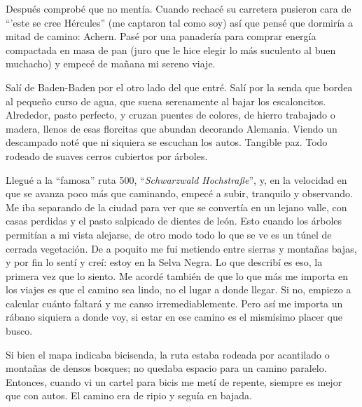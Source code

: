 Despu\'es comprob\'e que no ment\'ia. Cuando rechac\'e su carretera pusieron
cara de ``'este se cree H\'ercules'' (me captaron tal como
soy) as\'i que pens\'e que dormir\'ia a mitad de camino: Achern. Pas\'e por
una panader\'ia para comprar energ\'ia compactada en masa de pan (juro que le
hice elegir lo m\'as suculento al buen muchacho) y empec\'e de ma\~nana mi
sereno viaje.

Sal\'i de Baden-Baden por el otro lado del que entr\'e. Sal\'i por la senda que
bordea al peque\~no curso de agua, que suena serenamente al bajar los
escaloncitos. Alrededor, pasto perfecto, y cruzan puentes de colores, de hierro
trabajado o madera, llenos de esas florcitas que abundan decorando Alemania.
Viendo un descampado not\'e que ni siquiera se escuchan los autos. Tangible paz.
Todo rodeado de suaves cerros cubiertos por \'arboles.

Llegu\'e a la ``famosa'' ruta 500, ``\emph{Schwarzwald Hochstra\ss e}'', y, en
la velocidad en que se avanza poco m\'as que caminando, empec\'e a subir,
tranquilo y observando. Me iba separando de la ciudad para ver que se
convert\'ia en un lejano valle, con casas perdidas y el pasto salpicado de
dientes de le\'on. Esto cuando los \'arboles permit\'ian a mi vista alejarse,
de otro modo todo lo que se ve es un t\'unel de cerrada vegetaci\'on. De a
poquito me fui metiendo entre sierras y monta\~nas bajas, y por fin lo sent\'i
y cre\'i: estoy en la Selva Negra. Lo que describ\'i es eso, la primera vez
que lo siento. Me acord\'e tambi\'en de que lo que m\'as me importa en los
viajes es que el camino sea lindo, no el lugar a donde llegar. Si no, empiezo
a calcular cu\'anto faltar\'a y me canso irremediablemente. Pero as\'i me
importa un r\'abano siquiera a donde voy, si estar en ese camino es el
mism\'isimo placer que busco.

Si bien el mapa indicaba bicisenda, la ruta estaba rodeada por acantilado o
monta\~nas de densos bosques; no quedaba espacio para un camino paralelo.
Entonces, cuando vi un cartel para bicis me met\'i de repente, siempre es
mejor que con autos. El camino era de ripio y segu\'ia en bajada.

